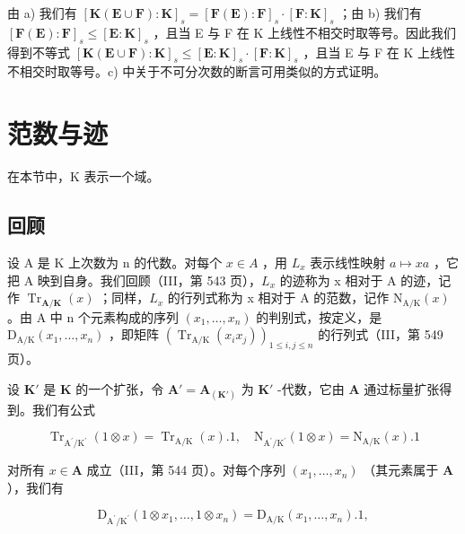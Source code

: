 由 a) 我们有 \([\mathbf{K}(\mathbf{E}\cup\mathbf{F}):\mathbf{K}]_{s}=[\mathbf{F}(\mathbf{E}):\mathbf{F}]_{s}\cdot[\mathbf{F}:\mathbf{K}]_{s}\) ；由 b) 我们有 \([\mathbf{F}(\mathbf{E}):\mathbf{F}]_{s}\leqslant[\mathbf{E}:\mathbf{K}]_{s}\) ，且当 E 与 F 在 K 上线性不相交时取等号。因此我们得到不等式 \([\mathbf{K}(\mathbf{E}\cup\mathbf{F}):\mathbf{K}]_{s}\leqslant[\mathbf{E}:\mathbf{K}]_{s}\cdot[\mathbf{F}:\mathbf{K}]_{s}\) ，且当 E 与 F 在 K 上线性不相交时取等号。c) 中关于不可分次数的断言可用类似的方式证明。

\section{范数与迹}

在本节中，K 表示一个域。

\subsection{回顾}

设 A 是 K 上次数为 n 的代数。对每个 \(x \in A\) ，用 \(L_{x}\) 表示线性映射 \(a \mapsto xa\) ，它把 A 映到自身。我们回顾（III，第 543 页），\(L_{x}\) 的迹称为 x 相对于 A 的迹，记作 \(\operatorname{Tr}_{\mathbf{A}/\mathbf{K}}(x)\) ；同样，\(L_{x}\) 的行列式称为 x 相对于 A 的范数，记作 \(\mathrm{N}_{\mathrm{A}/\mathrm{K}}(x)\) 。由 A 中 n 个元素构成的序列 \((x_{1}, \ldots, x_{n})\) 的判别式，按定义，是 \(\mathrm{D}_{\mathrm{A}/\mathrm{K}}(x_{1}, \ldots, x_{n})\) ，即矩阵 \((\operatorname{Tr}_{\mathrm{A}/\mathrm{K}}(x_{i}x_{j}))_{1 \leq i,j \leq n}\) 的行列式（III，第 549 页）。

设 \(\mathbf{K}'\) 是 \(\mathbf{K}\) 的一个扩张，令 \(\mathbf{A}' = \mathbf{A}_{(\mathbf{K}')}\) 为 \(\mathbf{K}'\) -代数，它由 \(\mathbf{A}\) 通过标量扩张得到。我们有公式

\[
\operatorname{Tr} _ {\mathrm{A} ^ {\prime} / \mathrm{K} ^ {\prime}} (1 \otimes x) = \operatorname{Tr} _ {\mathrm{A} / \mathrm{K}} (x). 1, \quad \mathrm{N} _ {\mathrm{A} ^ {\prime} / \mathrm{K} ^ {\prime}} (1 \otimes x) = \mathrm{N} _ {\mathrm{A} / \mathrm{K}} (x). 1\tag{1}
\]

对所有 \(x \in \mathbf{A}\) 成立（III，第 544 页）。对每个序列 \((x_1, \ldots, x_n)\) （其元素属于 \(\mathbf{A}\) ），我们有

\[
\mathrm{D} _ {\mathrm{A} ^ {\prime} / \mathrm{K} ^ {\prime}} (1 \otimes x _ {1}, \dots , 1 \otimes x _ {n}) = \mathrm{D} _ {\mathrm{A} / \mathrm{K}} (x _ {1}, \dots , x _ {n}). 1,\tag{2}
\]

